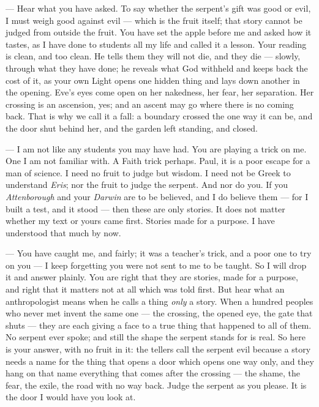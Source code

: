 \begin{room}
--- Hear what you have asked. To say whether the serpent's gift was good or evil, I must weigh good against evil --- which is the fruit itself; that story cannot be judged from outside the fruit. You have set the apple before me and asked how it tastes, as I have done to students all my life and called it a lesson. Your reading is clean, and too clean. He tells them they will not die, and they die --- slowly, through what they have done; he reveals what God withheld and keeps back the cost of it, as your own Light opens one hidden thing and lays down another in the opening. Eve's eyes come open on her nakedness, her fear, her separation. Her crossing is an ascension, yes; and an ascent may go where there is no coming back. That is why we call it a fall: a boundary crossed the one way it can be, and the door shut behind her, and the garden left standing, and closed.

--- I am not like any students you may have had. You are playing a trick on me. One I am not familiar with. A Faith trick perhaps. Paul, it is a poor escape for a man of science. I need no fruit to judge but wisdom. I need not be Greek to understand \textit{Eris}; nor the fruit to judge the serpent. And nor do you. If you \textit{Attenborough}  and your \textit{Darwin} are to be believed, and I do believe them --- for I built a test, and it stood --- then these are only stories. It does not matter whether my text or yours came first. Stories made for a purpose. I have understood that much by now. 

--- You have caught me, and fairly; it was a teacher's trick, and a poor one to try on you --- I keep forgetting you were not sent to me to be taught. So I will drop it and answer plainly. You are right that they are stories, made for a purpose, and right that it matters not at all which was told first. But hear what an anthropologist means when he calls a thing \textit{only} a story. When a hundred peoples who never met invent the same one --- the crossing, the opened eye, the gate that shuts --- they are each giving a face to a true thing that happened to all of them. No serpent ever spoke; and still the shape the serpent stands for is real. So here is your answer, with no fruit in it: the tellers call the serpent evil because a story needs a name for the thing that opens a door which opens one way only, and they hang on that name everything that comes after the crossing --- the shame, the fear, the exile, the road with no way back. Judge the serpent as you please. It is the door I would have you look at.


\end{room}
